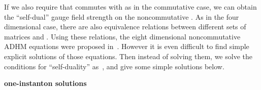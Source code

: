 \documentclass[a4paper,12pt]{article}
\begin{document}
If we also require that \coordHE{} commutes with \myHighlight{$\Sigma_{\mu}$}\coordHE{} 
as in the commutative case, 
we can obtain the ``self-dual'' gauge field strength on the 
noncommutative \coordHE{}. 
As in the four dimensional case, there are also equivalence relations 
between different sets of matrices \coordHE{} and 
\coordHE{} .
Using these relations, the eight dimensional noncommutative ADHM equations 
 were proposed in~\cite{ohta}.
However it is even difficult to find simple explicit solutions 
of those equations.
Then instead of solving them, we solve the conditions for ``self-duality'' 
as~\cite{pt}, and give some simple solutions below.



\begin{flushleft}
\textbf{\coordHE{} one-instanton solutions}
\end{flushleft}
\end{document}
